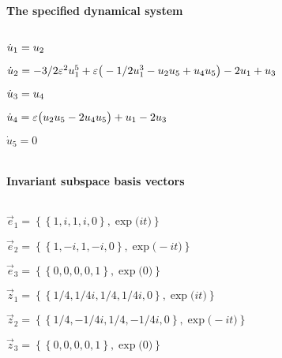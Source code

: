 
\(\)
\paragraph{The specified dynamical system}
\(
\)\par

\(\dot u_{1}=u\sb2
\)\par

\(\dot u_{2}=-3/2 \varepsilon^{2} u\sb1^{5}+\varepsilon \big(-1/2 u\sb1^{3}-u\sb2 u\sb5+
u\sb4 u\sb5\big)-2 u\sb1+u\sb3
\)\par

\(\dot u_{3}=u\sb4
\)\par

\(\dot u_{4}=\varepsilon \big(u\sb2 u\sb5-2 u\sb4 u\sb5\big)+u\sb1-2 u\sb3
\)\par

\(\dot u_{5}=0
\)\par

\(\)
\paragraph{Invariant subspace basis vectors}
\(
\)\par

\(\vec e_{1}=\left\{
\left\{
1 , i , 1 , i , 0
\right\} , \exp \big(i t\big)
\right\}
\)\par

\(\vec e_{2}=\left\{
\left\{
1 , -i , 1 , -i , 0
\right\} , \exp \big(-i t\big)
\right\}
\)\par

\(\vec e_{3}=\left\{
\left\{
0 , 0 , 0 , 0 , 1
\right\} , \exp \big(0\big)
\right\}
\)\par

\(\vec z_{1}=\left\{
\left\{
1/4 , 1/4 i , 1/4 , 1/4 i , 0
\right\} , \exp \big(i t\big)
\right\}
\)\par

\(\vec z_{2}=\left\{
\left\{
1/4 , -1/4 i , 1/4 , -1/4 i , 0
\right\} , \exp \big(-i t\big)
\right\}
\)\par

\(\vec z_{3}=\left\{
\left\{
0 , 0 , 0 , 0 , 1
\right\} , \exp \big(0\big)
\right\}
\)\par
